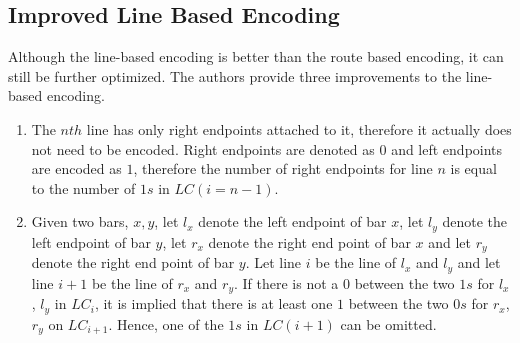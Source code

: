 \subsection{Improved Line Based Encoding}
Although the line-based encoding is better than the route based 
encoding, it can still be further optimized. The authors provide 
three improvements to the line-based encoding.
\begin{enumerate}
\item The $nth$ line has only right endpoints attached to it, 
therefore it actually does not need to be encoded. Right endpoints 
are denoted as $0$ and left endpoints are encoded as $1$, therefore the number of right endpoints 
for line $n$ is equal to the number of $1s$ in $LC(i=n-1)$.
\item Given two bars,
$x,y$, let $l_{x}$ denote the left endpoint of bar $x$, let 
$l_{y}$ denote the left endpoint of bar $y$, let $r_{x}$ denote 
the right end point of bar $x$ and let $r_{y}$ denote the right 
end point of bar $y$. Let line $i$ be the line of $l_{x}$ and $l_{y}$
and let line $i+1$ be the line of $r_{x}$ and $r_{y}$. If there is not a $0$ between 
the two  $1s$ for $l_{x}$, $l_{y}$ in $LC_{i}$, it is implied that there is at least one $1$ between 
the two $0s$ for $r_{x}$, $r_{y}$ on $LC_{i+1}$. Hence, one of the $1s$ in $LC(i+1)$ can be omitted. 


\end{enumerate}

